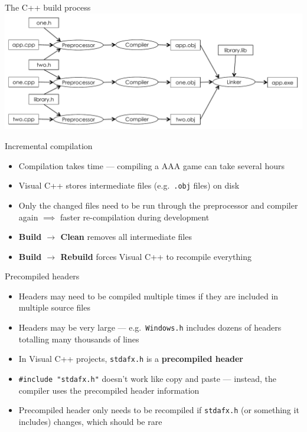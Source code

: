 \begin{frame}[fragile]{The C++ build process}
    \includegraphics[width=\textwidth]{compiler_flowchart.pdf}
\end{frame}

\begin{frame}[fragile]{Incremental compilation}
    \begin{itemize}
        \item Compilation takes time --- compiling a AAA game can take several hours
        \item Visual C++ stores intermediate files (e.g.\ \texttt{.obj} files) on disk
        \item Only the changed files need to be run through the preprocessor and compiler again
            $\implies$ faster re-compilation during development
        \item \textbf{Build $\to$ Clean} removes all intermediate files
        \item \textbf{Build $\to$ Rebuild} forces Visual C++ to recompile everything
    \end{itemize}
\end{frame}

\begin{frame}[fragile]{Precompiled headers}
    \begin{itemize}
        \item Headers may need to be compiled multiple times if they are included in multiple source files
        \item Headers may be very large ---
            e.g.\ \texttt{Windows.h} includes dozens of headers totalling many thousands of lines
        \item In Visual C++ projects, \texttt{stdafx.h} is a \textbf{precompiled header}
        \item \lstinline{#include "stdafx.h"} doesn't work like copy and paste ---
            instead, the compiler uses the precompiled header information
        \item Precompiled header only needs to be recompiled if \texttt{stdafx.h} (or something it includes)
            changes, which should be rare
    \end{itemize}
\end{frame}

